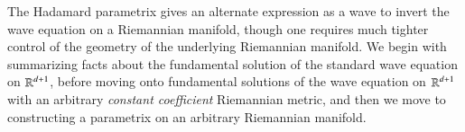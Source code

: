 The Hadamard parametrix gives an alternate expression as a wave to invert the wave equation on a Riemannian manifold, though one requires much tighter control of the geometry of the underlying Riemannian manifold. We begin with summarizing facts about the fundamental solution of the standard wave equation on $\operatorname{\mathbb{R}}^{d+1}$, before moving onto fundamental solutions of the wave equation on $\operatorname{\mathbb{R}}^{d+1}$ with an arbitrary \emph{constant coefficient} Riemannian metric, and then we move to constructing a parametrix on an arbitrary Riemannian manifold.

%
%
%
%
%
%
%
%
%
%
%
%
%
%
%
%

